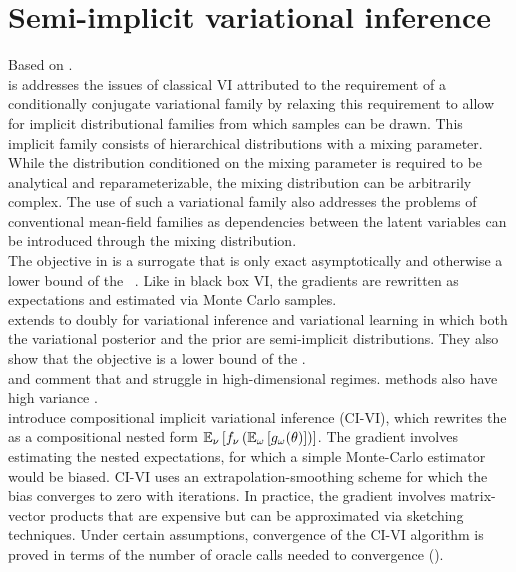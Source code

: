 \documentclass[10pt]{article}
\begin{document}
\newpage


\section{Semi-implicit variational inference}

Based on \citet{Yin:2018}.
\\

\sivi is addresses the issues of classical VI attributed to the requirement of a conditionally conjugate variational family by relaxing this requirement to allow for implicit distributional families from which samples can be drawn. This implicit family consists of hierarchical distributions with a mixing parameter. While the distribution conditioned on the mixing parameter is required to be analytical and reparameterizable, the mixing distribution can be arbitrarily complex. The use of such a variational family also addresses the problems of conventional mean-field families as dependencies between the latent variables can be introduced through the mixing distribution.
\\

The objective in \sivi is a surrogate \elbo that is only exact asymptotically and otherwise a lower bound of the \elbo~\citep{Molchanov:2019}. Like in black box VI, the gradients are rewritten as expectations and estimated via Monte Carlo samples.
\\

\citet{Molchanov:2019} extends \sivi to doubly \sivi for variational inference and variational learning in which both the variational posterior and the prior are semi-implicit distributions. They also show that the \sivi objective is a lower bound of the \elbo.
\\

\citet{Molchanova:2019} and \citet{Moens:2021} comment that \sivi and \uivi struggle in high-dimensional regimes. \mcmc methods also have high variance \citep{Moens:2021}.
\\

\citet{Moens:2021} introduce compositional implicit variational inference (CI-VI), which rewrites the \sivi \elbo as a compositional nested form $\mathbb{E}_\nu\left[f_\nu\left(\mathbb{E}_\omega\left[g_\omega(\theta)\right]\right)\right]$. The gradient involves estimating the nested expectations, for which a simple Monte-Carlo estimator would be biased. CI-VI uses an extrapolation-smoothing scheme for which the bias converges to zero with iterations. In practice, the gradient involves matrix-vector products that are expensive but can be approximated via sketching techniques. Under certain assumptions, convergence of the CI-VI algorithm is proved in terms of the number of oracle calls needed to convergence (\todo).
\end{document}
